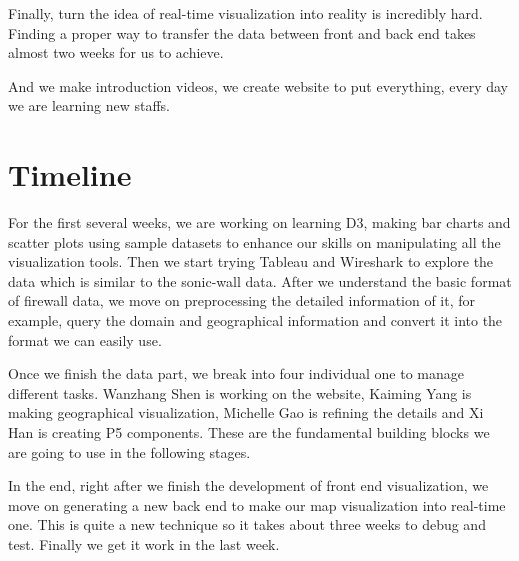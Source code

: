 Finally, turn the idea of real-time visualization into reality is incredibly hard. Finding a proper way to transfer the data between front and back end takes almost two weeks for us to achieve.

And we make introduction videos, we create website to put everything, every day we are learning new staffs.

\section{Timeline}
For the first several weeks, we are working on learning D3, making bar charts and scatter plots using sample datasets to enhance our skills on manipulating all the visualization tools. Then we start trying Tableau and Wireshark to explore the data which is similar to the sonic-wall data. After we understand the basic format of firewall data, we move on preprocessing the detailed information of it, for example, query the domain and geographical information and convert it into the format we can easily use.

Once we finish the data part, we break into four individual one to manage different tasks. Wanzhang Shen is working on the website, Kaiming Yang is making geographical visualization, Michelle Gao is refining the details and Xi Han is creating P5 components. These are the fundamental building blocks we are going to use in the following stages.

In the end, right after we finish the development of front end visualization, we move on generating a new back end to make our map visualization into real-time one. This is quite a new technique so it takes about three weeks to debug and test. Finally we get it work in the last week.

